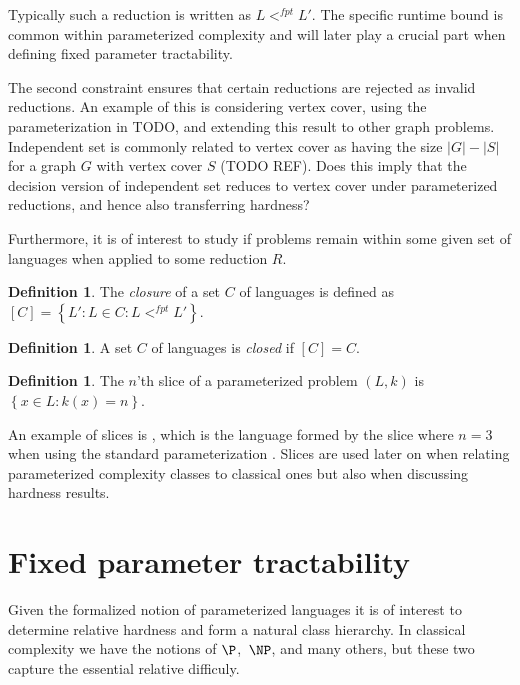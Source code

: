 \documentclass[a4paper,11pt,notitlepage]{report}
\theoremstyle{plain}
\theoremstyle{definition}
\newtheorem{defn}[thm]{Definition} %
\begin{document}
Typically such a reduction is written as $L <^{fpt} L'$.
The specific runtime bound is common within parameterized complexity and will later play a crucial part when defining fixed parameter tractability.

The second constraint ensures that certain reductions are rejected as invalid reductions.
An example of this is considering vertex cover, using the parameterization in TODO, and extending this result to other graph problems.
Independent set is commonly related to vertex cover as having the size $|G| - |S|$ for a graph $G$ with vertex cover $S$ (TODO REF).
Does this imply that the decision version of independent set reduces to vertex cover under parameterized reductions, and hence also transferring hardness?

Furthermore, it is of interest to study if problems remain within some given set of languages when applied to some reduction $R$.

\begin{defn}
The \emph{closure} of a set $C$ of languages is defined as $\left[ C \right] = \left\{ L' : L \in C : L <^{fpt} L'\right\}$.
\end{defn}

\begin{defn}
A set $C$ of languages is \emph{closed} if $\left[ C \right] = C$.
\end{defn}

\begin{defn}
The $n$'th slice of a parameterized problem $(L, k)$ is $\left\{ x \in L : k(x) = n \right\}$.
\end{defn}

An example of slices is , which is the language formed by the slice where $n = 3$ when using the standard parameterization .
Slices are used later on when relating parameterized complexity classes to classical ones but also when discussing hardness results.

\section{Fixed parameter tractability}
Given the formalized notion of parameterized languages it is of interest to determine relative hardness and form a natural class hierarchy.
In classical complexity we have the notions of $\P$, $\NP$, and many others, but these two capture the essential relative difficuly.
\end{document}
